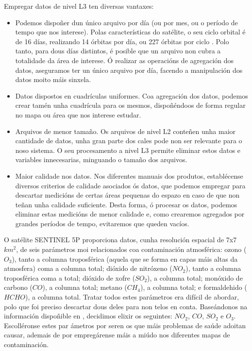 Empregar datos de nivel L3 ten diversas vantaxes:
\begin{itemize}
    \item Podemos dispoñer dun único arquivo por día (ou por mes, ou o período de tempo que nos interese). Polas características do satélite, o seu ciclo orbital é de 16 días, realizando 14 órbitas
    por día, ou 227 órbitas por ciclo \cite{s5porbit}. Polo tanto, para dous días distintos, é posible que un arquivo non cubra a totalidade da área de interese. Ó realizar as operacións de
    agregación dos datos, aseguramos ter un único arquivo por día, facendo a manipulación dos datos moito máis sinxela.
    \item Datos dispostos en cuadrículas uniformes. Coa agregación dos datos, podemos crear tamén unha cuadrícula para os mesmos, dispoñéndoos de forma regular no mapa ou área que nos interese
    estudar.
    \item Arquivos de menor tamaño. Os arquivos de nivel L2 conteñen unha maior cantidade de datos, unha gran parte dos cales pode non ser relevante para o noso sistema. O seu procesamento a nivel
    L3 permite eliminar estos datos e variables innecesarias, minguando o tamaño dos arquivos.
    \item Maior calidade nos datos. Nos diferentes manuais dos produtos, establécense diversos criterios de calidade asociados ós datos, que podemos empregar para descartar medicións de certas
    áreas pequenas do espazo en caso de que non teñan unha calidade suficiente. Desta forma, ó procesar os datos, podemos eliminar estas medicións de menor calidade e, como crearemos agregados por
    grandes períodos de tempo, evitaremos que queden vacíos.
\end{itemize}

O satélite SENTINEL 5P proporciona datos, cunha resolución espacial de 7x7 $km^2$, de seis parámetros moi relacionados coa contaminación atmosférica: ozono ($O_3$), tanto a columna troposférica (aquela
que se forma en capas máis altas da atmosfera) coma a columna total; dióxido de nitróxeno ($NO_2$), tanto a columna troposférica coma a total; dióxido de xofre ($SO_2$), a columna total; monóxido
de carbono ($CO$), a columna total; metano ($CH_4$), a columna total; e formaldehido ($HCHO$), a columna total. Tratar todos estes parámetros era difícil de abordar, polo que foi preciso
descartar dous deles para non telos en conta. Baseándonos na información dispoñible en \cite{airpollutants}, decidimos elixir os seguintes: $NO_2$, $CO$, $SO_2$ e $O_3$. Escolléronse estes par
ámetros por seren os que máis problemas de saúde adoitan causar, ademais de por empregárense máis a miúdo nos diferentes mapas de contaminación.

